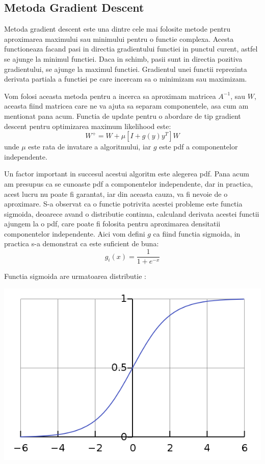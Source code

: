 \documentclass[12pt,oneside]{article}
\begin{document}
\subsection{Metoda Gradient Descent}
Metoda gradient descent este una dintre cele mai folosite metode pentru aproximarea maximului sau minimului pentru o functie complexa. Acesta functioneaza facand pasi in directia gradientului functiei in punctul curent, astfel se ajunge la minimul functiei. Daca in schimb, pasii sunt in directia pozitiva gradientului, se ajunge la maximul functiei. Gradientul unei functii reprezinta derivata partiala a functiei pe care incercam sa o minimizam sau maximizam.\cite{gradiend_descent_wiki}

Vom folosi aceasta metoda pentru a incerca sa aproximam matricea $A^{-1}$, sau $W$, aceasta fiind matricea care ne va ajuta sa separam componentele, asa cum am mentionat pana acum. Functia de update pentru o abordare de tip gradient descent pentru optimizarea maximum likelihood este:
\begin{equation}
	W^+=W+ \mu [I + g(y) y^T]W
\end{equation}
unde $\mu$ este rata de invatare a algoritmului, iar $g$ este pdf a componentelor independente.\cite{hyvarien}

Un factor important in succesul acestui algoritm este alegerea pdf. Pana acum am presupus ca se cunoaste pdf a componentelor independente, dar in practica, acest lucru nu poate fi garantat, iar din aceasta cauza, va fi nevoie de o aproximare. S-a observat ca o functie potrivita acestei probleme este functia sigmoida, deoarece avand o distributie continua, calculand derivata acestei functii ajungem la o pdf, care poate fi folosita pentru aproximarea densitatii componentelor independente. Aici vom defini $g$ ca fiind functia sigmoida, in practica s-a demonstrat ca este suficient de buna:
\begin{equation}
	g_i(x)=\frac{1}{1+e^{-x}}
\end{equation}

Functia sigmoida are urmatoarea distributie \cite{sigmoid_function_wiki}:
\begin{center}
	\includegraphics[scale=0.5]{sigmoid_function}
 \end{center}
\end{document}
